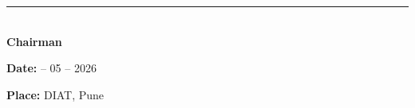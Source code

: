 \vspace{3.5em}
\vspace{1cm}
\noindent
\hfill
\begin{minipage}[t]{9cm}
	\centering
	\rule{9cm}{0.4pt}\\[0.3em]
	\textbf{Chairman}\\
\end{minipage}

\vspace{3.5em}
\noindent
\textbf{Date:} \quad -- 05 -- 2026

\vspace{0.5em}
\noindent
\textbf{Place:} DIAT, Pune
